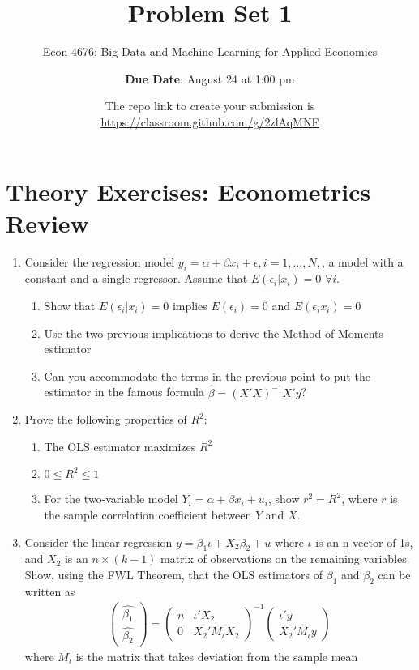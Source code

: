 \documentclass[12pt,onecolumn]{article}
\title{Problem Set 1}
\subtitle{Econ 4676: Big Data and Machine Learning for Applied Economics}
\author{{\bf Due Date}: August 24 at 1:00 pm}
\date{The repo link to create your submission is \url{https://classroom.github.com/g/2zlAqMNF}}
\begin{document}
\maketitle

\section{Theory Exercises: Econometrics Review}

\begin{enumerate}

  \item Consider the regression model $y_i = \alpha +\beta x_i +\epsilon, i=1,...,N,$, a model with a constant and a single regressor. Assume that $E(\epsilon_i|x_i)=0$ $\forall i$.
      \begin{enumerate}
        \item Show that $E(\epsilon_i|x_i)=0$ implies  $E(\epsilon_i)=0$ and  $E(\epsilon_i x_i)=0$
        \item Use the two previous implications to derive the Method of Moments estimator
        \item Can you accommodate the terms in the previous point to put the estimator in the famous formula $\hat \beta= (X'X)^{-1}X'y$?
      \end{enumerate}
  \item Prove the following properties of $R^2$:
        \begin{enumerate}
              \item The OLS estimator maximizes $R^2$
              \item $0 \leq R^2 \leq 1$
              \item For the two-variable model $Y_i = \alpha + \beta x_i + u_i$, show $r^2 = R^2$, where $r$ is the sample correlation coefficient between $Y$ and $X$.
    \end{enumerate}
    
    
  \item Consider the linear regression $y = \beta_1 \iota + X_2 \beta_2 +u$ where $\iota$ is an n-vector of 1s, and $X_2$ is an $n \times (k-1)$ matrix of observations on the remaining variables. Show, using the FWL Theorem, that the OLS estimators of $\beta_1$ and $\beta_2$ can be written as
  \begin{align}
  \left(\begin{array}{c}
    \hat{\beta_{1}}\\
    \hat{\beta_{2}}
    \end{array}\right)=\left(\begin{array}{cc}
    n & \iota'X_{2}\\
    0 & X_{2}'M_{\iota}X_{2}
    \end{array}\right)^{-1}\left(\begin{array}{c}
    \iota' y\\
    X_{2}'M_{\iota}y
    \end{array}\right)
  \end{align}
  where $M_{\iota}$ is the matrix that takes deviation from the sample mean


\end{enumerate}
\end{document}

